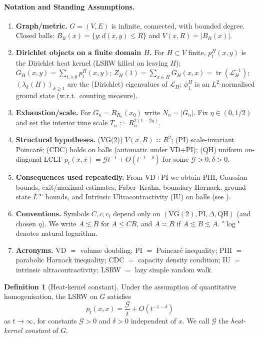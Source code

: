 \documentclass{article}
\numberwithin{equation}{section}
\theoremstyle{definition}
\newtheorem{definition}[theorem]{Definition}
\theoremstyle{remark}
\newcommand{\cG}{\mathcal{G}}
\DeclareMathOperator{\tr}{tr}
\newcommand{\LL}{\mathcal{L}}
\begin{document}
\paragraph{Notation and Standing Assumptions.}
\begin{enumerate}[label={}]
  \item \textbf{Graph/metric.} $G=(V,E)$ is infinite, connected, with bounded degree. Closed balls: $B_R(x)=\{y:d(x,y)\le R\}$ and $V(x,R)=|B_R(x)|$.
  \item \textbf{Dirichlet objects on a finite domain $H$.} For $H\subset V$ finite, $p_t^{H}(x,y)$ is the Dirichlet heat kernel (LSRW killed on leaving $H$); $G_H(x,y)=\sum_{t\ge0} p_t^{H}(x,y)$; $Z_H(1)=\sum_{x\in H} G_H(x,x)=\tr(\LL_H^{-1})$; $(\lambda_k(H))_{k\ge1}$ are the (Dirichlet) eigenvalues of $\LL_H$; $\phi_1^{H}$ is an $L^2$-normalised ground state (w.r.t.\ counting measure).
  \item \textbf{Exhaustion/scale.} For $G_n=B_{R_n}(x_0)$ write $N_n=|G_n|$. Fix $\eta\in(0,1/2)$ and set the interior time scale $T_n:=R_n^{2(1-2\eta)}$.
  \item \textbf{Structural hypotheses.} (VG(2)) $V(x,R)\asymp R^2$; (PI) scale-invariant Poincaré; (CDC) holds on balls (automatic under VD+PI); (QH) uniform on-diagonal LCLT $p_t(x,x)=\cG t^{-1}+O(t^{-1-\delta})$ for some $\cG>0,\delta>0$.
  \item \textbf{Consequences used repeatedly.} From VD+PI we obtain PHI, Gaussian bounds, exit/maximal estimates, Faber–Krahn, boundary Harnack, ground-state $L^\infty$ bounds, and Intrinsic Ultracontractivity (IU) on balls (see ).
  \item \textbf{Conventions.} Symbols $C,c,c_i$ depend only on $(\mathrm{VG(2)},\mathrm{PI},\Delta,\mathrm{QH})$ (and chosen $\eta$). We write $A\lesssim B$ for $A\le C B$, and $A\asymp B$ if $A\lesssim B\lesssim A$. "$\log$" denotes natural logarithm.
  \item \textbf{Acronyms.} VD $=$ volume doubling; PI $=$ Poincaré inequality; PHI $=$ parabolic Harnack inequality; CDC $=$ capacity density condition; IU $=$ intrinsic ultracontractivity; LSRW $=$ lazy simple random walk.
\end{enumerate}

\begin{definition}[Heat-kernel constant]\label{def:G}
Under the assumption of quantitative homogenisation, the LSRW on $G$ satisfies
\[
  p_t(x,x)=\frac{\cG}{t}+O(t^{-1-\delta})
\]
as $t\to\infty$, for constants $\cG>0$ and $\delta>0$ independent of $x$. We call $\cG$ the \emph{heat-kernel constant} of $G$.
\end{definition}
\end{document}
